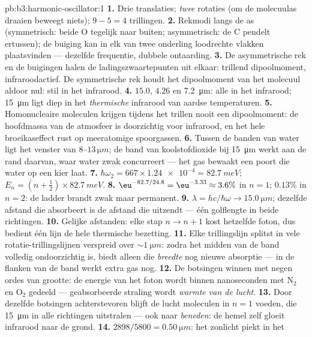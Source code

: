 \begin{solution}{pb:b3:harmonic-oscillator:1}
\textbf{1.} Drie translaties; \emph{twee} rotaties (om de molecuulas
draaien beweegt niets); $9 - 5 = 4$ trillingen.
\textbf{2.} Rekmodi langs de as (symmetrisch: beide O tegelijk naar
buiten; asymmetrisch: de C pendelt ertussen); de buiging kan in elk van
twee onderling loodrechte vlakken plaatsvinden --- dezelfde frequentie,
dubbele ontaarding.
\textbf{3.} De asymmetrische rek en de buigingen halen de
ladingszwaartepunten uit elkaar: trillend dipoolmoment, infraroodactief.
De symmetrische rek houdt het dipoolmoment van het molecuul aldoor nul:
stil in het infrarood.
\textbf{4.} $15.0$, $4.26$ en \qty{7.2}{\micro m}: alle in het infrarood;
\qty{15}{\micro m} ligt diep in het \emph{thermische} infrarood van
aardse temperaturen.
\textbf{5.} Homonucleaire moleculen krijgen tijdens het trillen nooit een
dipoolmoment: de hoofdmassa van de atmosfeer is doorzichtig voor
infrarood, en het hele broeikaseffect rust op meeratomige spoorgassen.
\textbf{6.} Tussen de banden van water ligt het venster van
$8$--$13\,\unit{\micro m}$; de band van koolstofdioxide bij
\qty{15}{\micro m} werkt aan de rand daarvan, waar water zwak
concurreert --- het gas bewaakt een poort die water op een kier laat.
\textbf{7.} $\hbar\omega_2 = 667 \times \num{1.24e-4} =
\qty{82.7}{meV}$; $E_n = (n + \tfrac12) \times \qty{82.7}{meV}$.
\textbf{8.} $\eu^{-82.7/24.8} = \eu^{-3.33} \approx 3.6\%$ in $n =
1$; $0.13\%$ in $n = 2$: de ladder brandt zwak maar permanent.
\textbf{9.} $\lambda = hc/\hbar\omega \to \qty{15.0}{\micro m}$; dezelfde
afstand die absorbeert is de afstand die uitzendt --- één golflengte in
beide richtingen.
\textbf{10.} Gelijke afstanden: elke stap $n \to n + 1$ kost hetzelfde
foton, dus bedient één lijn de hele thermische bezetting.
\textbf{11.} Elke trillingslijn splitst in vele rotatie-trillingslijnen
verspreid over $\sim\qty{1}{\micro m}$: zodra het midden van de band
volledig ondoorzichtig is, biedt alleen die \emph{breedte} nog nieuwe
absorptie --- in de flanken van de band werkt extra gas nog.
\textbf{12.} De botsingen winnen met negen ordes van grootte: de energie
van het foton wordt binnen nanoseconden met N$_2$ en O$_2$ gedeeld ---
geabsorbeerde straling wordt \emph{warmte van de lucht}.
\textbf{13.} Door dezelfde botsingen achterstevoren blijft de lucht
moleculen in $n = 1$ voeden, die \qty{15}{\micro m} in alle richtingen
uitstralen --- ook naar \emph{beneden}: de hemel zelf gloeit infrarood
naar de grond.
\textbf{14.} $2898/5800 = \qty{0.50}{\micro m}$: het zonlicht piekt in het

\end{solution}

